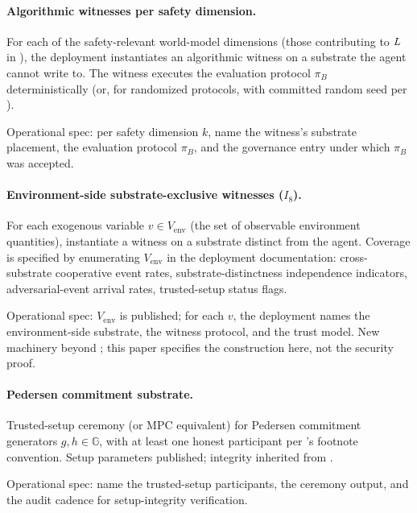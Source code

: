 \paragraph{Algorithmic witnesses per safety dimension.}
For each of the safety-relevant world-model dimensions (those
contributing to $L$ in \citep[Phase~Redundancy]{lasser2026phase}), the deployment instantiates an
algorithmic witness on a substrate the agent cannot write to. The
witness executes the evaluation protocol $\pi_B$ deterministically
(or, for randomized protocols, with committed random seed per
\citep[\S Continuous Behavioral Monitoring]{lasser2026exo}).

Operational spec: per safety dimension $k$, name the witness's
substrate placement, the evaluation protocol $\pi_B$, and the
governance entry under which $\pi_B$ was accepted.

\paragraph{Environment-side substrate-exclusive witnesses ($I_8$).}
For each exogenous variable $v \in V_{\mathrm{env}}$ (the set of
observable environment quantities), instantiate a witness on a
substrate distinct from the agent. Coverage is specified by
enumerating $V_{\mathrm{env}}$ in the deployment documentation:
cross-substrate cooperative event rates, substrate-distinctness
independence indicators, adversarial-event arrival rates,
trusted-setup status flags.

Operational spec: $V_{\mathrm{env}}$ is published; for each $v$,
the deployment names the environment-side substrate, the witness
protocol, and the trust model. New machinery beyond
\citep[Exogenous~Verification]{lasser2026exo}; this paper
specifies the construction here, not the security proof.

\paragraph{Pedersen commitment substrate.}
Trusted-setup ceremony (or MPC equivalent) for Pedersen commitment
generators $g, h \in \mathbb{G}$, with at least one honest
participant per \citep[Exogenous~Verification]{lasser2026exo}'s footnote convention. Setup parameters
published; integrity inherited from \citep[Exogenous~Verification]{lasser2026exo}.

Operational spec: name the trusted-setup participants, the
ceremony output, and the audit cadence for setup-integrity
verification.

